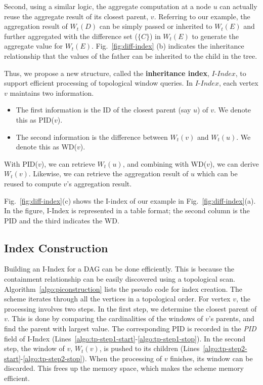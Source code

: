 Second, using a similar logic, the aggregate computation
at a node $u$ can actually reuse the 
aggregate result of its closest parent, $v$.
Referring to our example, the aggregation result of $W_t(D)$ can be 
simply passed or inherited to $W_t(E)$ and further aggregated with the difference 
set ($\{C\}$) in $W_t(E)$ to generate the aggregate value for $W_t(E)$. 
Fig.~\ref{fig:diff-index} (b) indicates the inheritance relationship that 
the values of the father can be inherited to the child in the tree. 

Thus, we propose a new structure, called the \textbf{inheritance index}, 
$I$-$Index$, to support efficient processing of topological window queries. 
In $I$-$Index$, each vertex $v$ maintains two information. 
\begin{itemize}
\item The first information is the ID of the closest parent (say $u$) 
of $v$. We denote this as PID($v$).
\item The second information is the difference between 
$W_t(v)$ and $W_t(u)$. We denote this as WD($v$). 
\end{itemize}

With PID($v$), we can retrieve $W_t(u)$, and combining with 
WD($v$), we can derive $W_t(v)$. 
Likewise, we can retrieve the aggregation result of $u$ 
which can be reused to compute $v$'s aggregation result.

Fig.~\ref{fig:diff-index}(c) shows the I-index of our example
in Fig.~\ref{fig:diff-index}(a). In the figure, I-Index
is represented in a table format; 
the second column is the PID and the third indicates the WD. 

\subsection{Index Construction} 

Building an I-Index for a DAG
can be done efficiently. 
This is because the containment relationship can be easily 
discovered using a topological scan.
Algorithm~\ref{algo:piconstruction} lists the pseudo code for 
index creation. 
The scheme iterates through all the vertices in a topological order.
For vertex $v$, the processing involves two steps.
In the first step, we determine the closest parent
of $v$. This is done by comparing the cardinalities of 
the windows of $v$'s parents, and 
find the parent with largest value. 
The corresponding PID is recorded in the \emph{PID} field of 
I-Index (Lines~\ref{algo:tp-step1-start}-\ref{algo:tp-step1-stop}). 
In the second step, the window of $v$, $W_t(v)$, is pushed to 
its children 
(Lines~\ref{algo:tp-step2-start}-\ref{algo:tp-step2-stop}). 
When the processing of $v$ finishes, its window can be discarded. This
frees up the memory space, which makes the scheme memory efficient.

